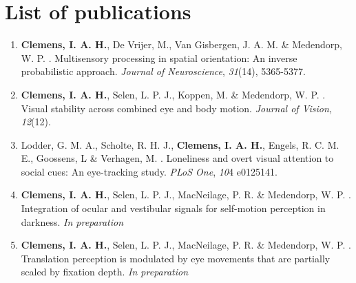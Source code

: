 \clearpage
\pagestyle{empty}

\chapter*{List of publications}
{}

\begin{enumerate}

\item \textbf{Clemens, I. A. H.}, De Vrijer, M., Van Gisbergen, J. A. M. \& Medendorp, W. P.
\citeyear{clemens2011}. Multisensory processing in spatial orientation: An inverse probabilistic approach. \textit{Journal of Neuroscience}, \textit{31}(14), 5365-5377.

\item \textbf{Clemens, I. A. H.}, Selen, L. P. J., Koppen, M. \& Medendorp, W. P. \citeyear{clemens2012}. Visual stability across combined eye and body motion. \textit{Journal of Vision}, \textit{12}(12).

\item Lodder, G. M. A., Scholte, R. H. J., \textbf{Clemens, I. A. H.}, Engels, R. C. M. E., Goossens, L \& Verhagen, M. \citeyear{lodder2015}. Loneliness and overt visual attention to social cues: An eye-tracking study. \textit{PLoS One}, \textit{10}{4} e0125141.

\item \textbf{Clemens, I. A. H.}, Selen, L. P. J., MacNeilage, P. R. \& Medendorp, W. P. \citeyear{clemens2015a}. Integration of ocular and vestibular signals for self-motion perception in darkness. \textit{In preparation}

\item \textbf{Clemens, I. A. H.}, Selen, L. P. J., MacNeilage, P. R. \& Medendorp, W. P. \citeyear{clemens2015b}. Translation perception is modulated by eye movements that are partially scaled by fixation depth. \textit{In preparation}

\end{enumerate}
